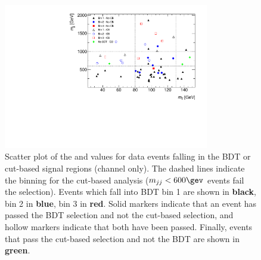 \begin{figure}[h]
\centering
\includegraphics[width=0.8\textwidth]{fig/analysis/data_scatter_mjj_mt.pdf}
\caption{Scatter plot of the \mjj and \mT values for data events falling in
the BDT or cut-based signal regions (\emme channel only). The dashed
lines indicate the binning for the cut-based analysis ($\mjj < 600
\gev$ events fail the selection). Events which fall into BDT bin 1 are
shown in {\bf black}, bin 2 in {\bf\color{blue}blue}, bin 3 in
{\bf\color{red}red}. Solid markers indicate that an event has passed
the BDT selection and not the cut-based selection, and hollow markers
indicate that both have been passed. Finally, events that pass the
cut-based selection and not the BDT are shown in {\bf\color{green}green}.}
\label{chap:analysis:fig:scatterplot_mjj_mt}
\end{figure}

